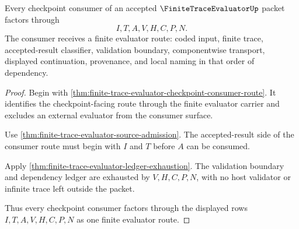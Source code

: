 \begin{theorem}
\label{thm:finite-trace-evaluator-consumer-factorization}
Every checkpoint consumer of an accepted $\FiniteTraceEvaluatorUp$ packet factors through
$$
I,T,A,V,H,C,P,N.
$$
The consumer receives a finite evaluator route: coded input, finite trace, accepted-result classifier, validation boundary, componentwise transport, displayed continuation, provenance, and local naming in that order of dependency.
\end{theorem}
\begin{proof}
Begin with \autoref{thm:finite-trace-evaluator-checkpoint-consumer-route}. It identifies the checkpoint-facing route through the finite evaluator carrier and excludes an external evaluator from the consumer surface.

Use \autoref{thm:finite-trace-evaluator-source-admission}. The accepted-result side of the consumer route must begin with $I$ and $T$ before $A$ can be consumed.

Apply \autoref{thm:finite-trace-evaluator-ledger-exhaustion}. The validation boundary and dependency ledger are exhausted by $V,H,C,P,N$, with no host validator or infinite trace left outside the packet.

Thus every checkpoint consumer factors through the displayed rows $I,T,A,V,H,C,P,N$ as one finite evaluator route.
\end{proof}

